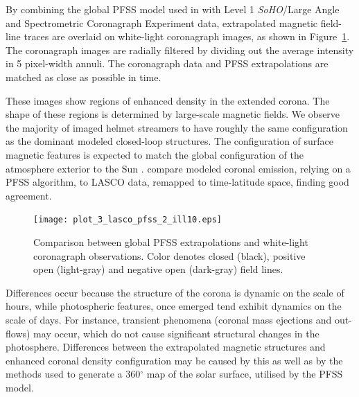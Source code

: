 By combining the global \gls{PFSS} model used in \citet{Schrijver:2003} with Level 1 \emph{SoHO}/Large Angle and Spectrometric Coronagraph Experiment \citep[LASCO;][]{brueckner:1995} data, extrapolated magnetic field-line traces are overlaid on white-light coronagraph images, as shown in Figure~\ref{plot_3_lasco_pfss}. The coronagraph images are radially filtered by dividing out the average intensity in 5 pixel-width annuli. The coronagraph data and \gls{PFSS} extrapolations are matched as close as possible in time. 

These images show regions of enhanced density in the extended corona. The shape of these regions is determined by large-scale magnetic fields. We observe the majority of imaged helmet streamers to have roughly the same configuration as the dominant modeled closed-loop structures. The configuration of surface magnetic features is expected to match the global configuration of the atmosphere exterior to the Sun \citep{Schrijver:2003}. \citet{Wang:2009} compare modeled coronal emission, relying on a \gls{PFSS} algorithm, to LASCO data, remapped to time-latitude space, finding good agreement. 

\begin{landscape}
\begin{figure}[!t]
\centerline{\texttt{[image: plot\_3\_lasco\_pfss\_2\_ill10.eps]}}
\caption[Comparison between PFSS extrapolations and white-light images.]{Comparison between global PFSS extrapolations and white-light coronagraph observations. Color denotes closed (black), positive open (light-gray) and negative open (dark-gray) field lines.}\label{plot_3_lasco_pfss}
\end{figure}
\end{landscape}

Differences occur because the structure of the corona is dynamic on the scale of hours, while photospheric features, once emerged tend exhibit dynamics on the scale of days. For instance, transient phenomena (coronal mass ejections and out-flows) may occur, which do not cause significant structural changes in the photosphere. Differences between the extrapolated magnetic structures and enhanced coronal density configuration may be caused by this as well as by the methods used to generate a 360$^\circ$ map of the solar surface, utilised by the \gls{PFSS} model. 

